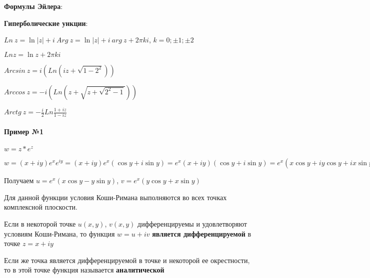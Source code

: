 \documentclass{article}
\begin{document}
\textbf{Формулы Эйлера}:
\begin{multienumerate}
\end{multienumerate}

\textbf{Гиперболические ункции}:
\begin{multienumerate}
\end{multienumerate}

$Ln \ z = \ln |z| + i \ Arg \ z = \ln |z| + i \ arg \ z + 2 \pi k i$, $k = 0; \pm 1; \pm 2$

$Ln z = \ln z + 2 \pi k i$

\hfill

$Arcsin \ z = i (Ln (i z + \sqrt{1 - 2^2}))$

$Arccos \ z = - i (Ln (z + \sqrt{z + \sqrt{2^2 - 1}}))$

$Arctg \ z = - \frac{i}{2} Ln \frac{1 + i z}{1 - iz}$

\paragraph{Пример №1}

$w = z * e^{z}$

$w  = (x + i y) e^{x} e^{i y} = (x + i y) e^{x} (\cos y + i \sin y) = e^{x} (x + i y)(\cos y + i \sin y) = e^{x} (x \cos y + i y \cos y + i x \sin y + i^{2} y \sin y) = e^{x} (x \cos y - y \sin y) + i e^{x} (y \cos y + x \sin y)$

Получаем $u = e^{x} (x \cos y - y \sin y)$, $v = e^{x} (y \cos y + x \sin y)$

\hfill

\begin{multienumerate}
\end{multienumerate}

Для данной функции условия Коши-Римана выполняются во всех точках комплексной плоскости.

\hfill

Если в некоторой точке $u (x, y)$, $v (x, y)$ дифференцируемы и удовлетворяют условиям Коши-Римана, то функция $w = u + i v$ \textbf{является дифференцируемой} в точке $z = x + i y$

Если же точка является дифференцируемой в точке и некоторой ее окрестности, то в этой точке функция называется \textbf{аналитической}
\end{document}
